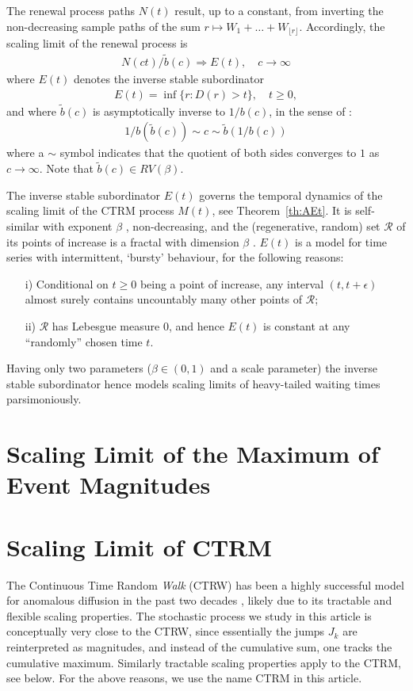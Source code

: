 \documentclass[honours,12pt]{UNSWthesis}
\newcommand{\1}{\mathbf 1}
\numberwithin{equation}{section}
\theoremstyle{definition}
\theoremstyle{remark}
\begin{document}
The renewal process paths $N(t)$ result, up to a constant, from
inverting the non-decreasing sample paths of the sum
$r \mapsto W_1 + \ldots + W_{\lfloor r \rfloor}$.
Accordingly, the scaling limit of the renewal process is \cite{limitCTRW} 
\begin{align}
N(ct) / \tilde b(c) \Rightarrow E(t), \quad c \to \infty
\end{align}
where $E(t)$ denotes the inverse stable subordinator \cite{invSubord}
\begin{align}
E(t) = \inf\{r: D(r) > t\}, \quad t \ge 0,
\end{align}
and where $\tilde b(c)$ is asymptotically inverse to $1/b(c)$, in the sense
of \cite[p.20]{seneta}: 
\begin{align}
1/b(\tilde b(c)) \sim c \sim \tilde b(1/b(c))
\end{align}
where a $\sim$ symbol indicates that the quotient of both sides converges to
$1$ as $c \to \infty$. 
Note that $\tilde b(c) \in RV(\beta)$. 

The inverse stable subordinator $E(t)$ governs the temporal dynamics of
the scaling limit of the CTRM process $M(t)$, see Theorem~\ref{th:AEt}. 
It is self-similar with exponent $\beta$
\cite{limitCTRW}, non-decreasing, and the (regenerative, random) set 
$\mathcal R$ of its points of increase is a fractal with dimension $\beta$ 
\cite{Bertoin04}.
$E(t)$ is a model for time series with intermittent, `bursty'
behaviour, for the following reasons:
\begin{itemize}
\item [i)]
Conditional on $t \ge 0$ being a point of increase, any interval 
$(t, t+ \epsilon)$ almost surely contains uncountably many other points of 
$\mathcal R$; 
\item [ii)]
$\mathcal R$ has Lebesgue measure $0$, and hence $E(t)$ is
constant at any ``randomly'' chosen time $t$. 
\end{itemize}
Having only two parameters ($\beta \in (0,1)$ and a scale parameter)
the inverse stable subordinator hence models scaling limits of heavy-tailed 
waiting times parsimoniously.

\section{Scaling Limit of the Maximum of Event Magnitudes}\label{s-max}
\section{Scaling Limit of CTRM}
The Continuous Time Random \emph{Walk} (CTRW) has been a highly successful 
model for anomalous diffusion in the past two decades 
\cite{Metzler2000,HLS2010b}, likely due to its tractable and flexible scaling
properties.
The stochastic process we study in this article is conceptually very close
to the CTRW, since essentially the jumps $J_k$ are reinterpreted as 
magnitudes, and instead of the cumulative sum, one tracks the cumulative 
maximum. Similarly tractable scaling properties apply to the CTRM, see below.
For the above reasons, we use the name CTRM in this article.
\end{document}
